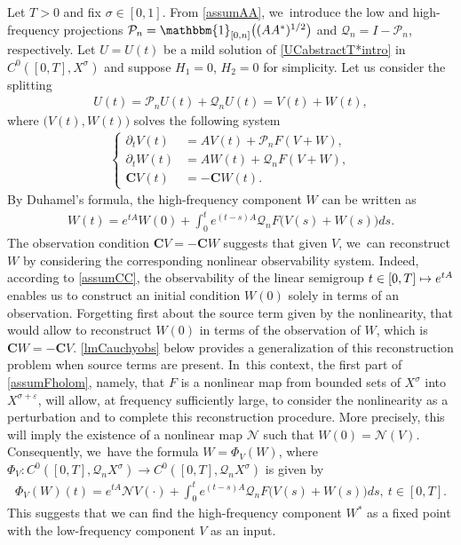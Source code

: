 \documentclass[JEP,XML,SOM,Unicode,published]{cedram}
\newcommand\mto{\mathchoice{\longmapsto}{\mapsto}{\mapsto}{\mapsto}}
\theoremstyle{definition}
\let\mc\mathcal
\let\veps\varepsilon
\newcommand{\Q}{\mathcal{Q}}
\renewcommand{\P}{\mathcal{P}}
\newcommand{\bC}{\boldsymbol{C}}
\begin{document}
Let $T>0$ and fix $\sigma\in [0, 1]$. From \cref{assumAA}, we~introduce the low and high-frequency projections $\P_n=\mathbbm{1}_{[0, n]}\big((AA^*)^{1/2}\big)$ and $\Q_n=I-\P_n$, respectively. Let $U=U(t)$ be a mild solution of \eqref{UCabstractT*intro} in $C^0([0, T], X^\sigma)$ and suppose $H_1=0$, $H_2=0$ for simplicity. Let us consider the splitting
\begin{align*}
U(t)=\P_n U(t)+\Q_nU(t)=V(t)+W(t),
\end{align*}
where $\big(V(t), W(t)\big)$ solves the following system
\begin{align*}
\left\{\begin{array}{rl}
\partial_t V(t)&=AV(t)+\P_n F(V+W), \\[3pt]
\partial_t W(t)&=AW(t)+\Q_n F(V+W), \\[3pt]
\bC V(t)&=-\bC W(t).
\end{array}\right.
\end{align*}
By Duhamel's formula, the high-frequency component $W$ can be written as
\begin{align*}
W(t)=e^{tA}W(0)+\int_0^t e^{(t-s)A}\Q_n F\big(V(s)+W(s)\big)ds.
\end{align*}
The observation condition $\bC V=-\bC W$ suggests that given $V$, we~can reconstruct $W$ by considering the corresponding nonlinear observability system. Indeed, according to \cref{assumCC}, the observability of the linear semigroup $t\in [0, T]\mto e^{tA}$ enables us to construct an initial condition $W(0)$ solely in terms of an observation. Forgetting first about the source term given by the nonlinearity, that would allow to reconstruct $W(0)$ in terms of the observation of $W$, which is $\bC W=-\bC V$. \cref{lmCauchyobs} below provides a generalization of this reconstruction problem when source terms are present. In~this context, the first part of \cref{assumFholom}, namely, that $F$ is a nonlinear map from bounded sets of $X^\sigma$ into $X^{\sigma+\veps}$, will allow, at frequency sufficiently large, to consider the nonlinearity as a perturbation and to complete this reconstruction procedure. More precisely, this will imply the existence of a nonlinear map $\mc{N}$ such that $W(0)=\mc{N}(V)$. Consequently, we~have the formula $W=\Phi_V(W)$, where $\Phi_V: C^0([0, T], \Q_nX^\sigma)\to C^0([0, T], \Q_nX^\sigma)$ is given by
\begin{align*}
\Phi_V(W)(t)=e^{tA}\mc{N}V(\cdot)+\int_0^t e^{(t-s)A}\Q_n F\big(V(s)+W(s)\big)ds,\ t\in [0, T].
\end{align*}
This suggests that we can find the high-frequency component $W^*$ as a fixed point with the low-frequency component $V$ as an input.
\end{document}
